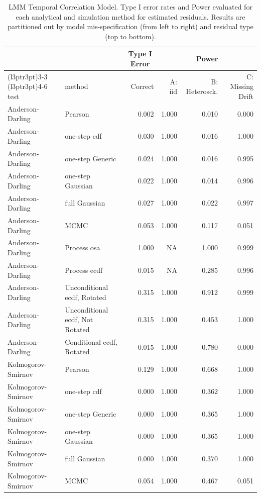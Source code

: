 \documentclass[
]{article}
\begin{document}
\begin{table}[H]
\centering
\caption{\label{tab:randomwalk-lmm-est}LMM Temporal Correlation Model. Type I error rates and Power evaluated for each analytical and simulation method for estimated residuals. Results are partitioned out by model mis-specification (from left to right) and residual type (top to bottom).}
\centering
\begin{tabular}[t]{llrrrr}
\toprule
\multicolumn{1}{c}{ } & \multicolumn{1}{c}{ } & \multicolumn{1}{c}{Type I Error} & \multicolumn{3}{c}{Power} \\
\cmidrule(l{3pt}r{3pt}){3-3} \cmidrule(l{3pt}r{3pt}){4-6}
test & method & Correct & A: iid & B: Heterosck. & C: Missing Drift\\
\midrule
Anderson-Darling & Pearson & 0.002 & 1.000 & 0.010 & 0.000\\
Anderson-Darling & one-step cdf & 0.030 & 1.000 & 0.016 & 1.000\\
Anderson-Darling & one-step Generic & 0.024 & 1.000 & 0.016 & 0.995\\
Anderson-Darling & one-step Gaussian & 0.022 & 1.000 & 0.014 & 0.996\\
Anderson-Darling & full Gaussian & 0.027 & 1.000 & 0.022 & 0.997\\
\addlinespace
Anderson-Darling & MCMC & 0.053 & 1.000 & 0.117 & 0.051\\
Anderson-Darling & Process osa & 1.000 & NA & 1.000 & 0.999\\
Anderson-Darling & Process ecdf & 0.015 & NA & 0.285 & 0.996\\
Anderson-Darling & Unconditional ecdf, Rotated & 0.315 & 1.000 & 0.912 & 0.999\\
Anderson-Darling & Unconditional ecdf, Not Rotated & 0.315 & 1.000 & 0.453 & 1.000\\
\addlinespace
Anderson-Darling & Conditional ecdf, Rotated & 0.015 & 1.000 & 0.780 & 0.000\\
Kolmogorov- Smirnov & Pearson & 0.129 & 1.000 & 0.668 & 1.000\\
Kolmogorov- Smirnov & one-step cdf & 0.000 & 1.000 & 0.362 & 1.000\\
Kolmogorov- Smirnov & one-step Generic & 0.000 & 1.000 & 0.365 & 1.000\\
Kolmogorov- Smirnov & one-step Gaussian & 0.000 & 1.000 & 0.365 & 1.000\\
\addlinespace
Kolmogorov- Smirnov & full Gaussian & 0.000 & 1.000 & 0.370 & 1.000\\
Kolmogorov- Smirnov & MCMC & 0.054 & 1.000 & 0.467 & 0.051\\

\end{tabular}
\end{table}
\end{document}
